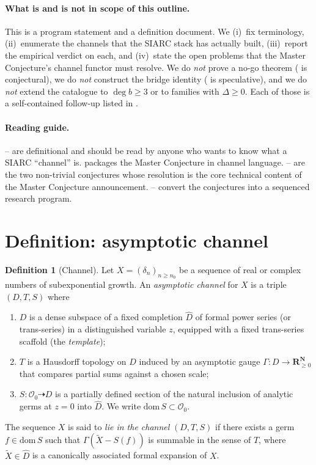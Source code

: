 \documentclass[11pt,reqno]{amsart}
\theoremstyle{plain}
\theoremstyle{definition}
\newtheorem{definition}[theorem]{Definition}
\theoremstyle{remark}
\newcommand{\dn}{\delta_{n}}
\begin{document}
\paragraph{What is and is not in scope of this outline.}
This is a program statement and a definition document. We
(i)~fix terminology, (ii)~enumerate the channels that the
SIARC stack has actually built, (iii)~report the empirical
verdict on each, and (iv)~state the open problems that the
Master Conjecture's channel functor must resolve. We do
\emph{not} prove a no-go theorem ( is
conjectural), we do \emph{not} construct the bridge identity
( is speculative), and we do \emph{not}
extend the catalogue to $\deg b \ge 3$ or to families with
$\Delta \geq 0$. Each of those is a self-contained follow-up
listed in .

\paragraph{Reading guide.}
-- are definitional and
should be read by anyone who wants to know what a SIARC
``channel'' is.  packages the Master
Conjecture in channel language. --%
 are the two non-trivial conjectures whose
resolution is the core technical content of the Master
Conjecture announcement. --%
 convert the conjectures into a sequenced
research program.

\section{Definition: asymptotic channel}
\label{sec:def}

\begin{definition}[Channel]\label{def:channel}
Let $X = (\dn)_{n \geq n_0}$ be a sequence of real or
complex numbers of subexponential growth. An
\emph{asymptotic channel} for $X$ is a triple $(D, T, S)$
where
\begin{enumerate}
\item $D$ is a dense subspace of a fixed completion
$\widehat{D}$ of formal power series (or trans-series)
in a distinguished variable $z$, equipped with a fixed
trans-series scaffold (the \emph{template});
\item $T$ is a Hausdorff topology on $D$ induced by an
asymptotic gauge $\Gamma : D \to \mathbf{R}_{\ge 0}^{\mathbf{N}}$
that compares partial sums against a chosen scale;
\item $S : \mathcal{O}_0 \dashrightarrow D$ is a partially
defined section of the natural inclusion of analytic
germs at $z=0$ into $\widehat{D}$. We write
$\mathrm{dom}\, S \subset \mathcal{O}_0$.
\end{enumerate}
The sequence $X$ is said to \emph{lie in the channel}
$(D,T,S)$ if there exists a germ $f \in \mathrm{dom}\, S$
such that $\Gamma(\widetilde X - S(f))$ is summable in the
sense of $T$, where $\widetilde X \in \widehat D$ is a
canonically associated formal expansion of $X$.
\end{definition}
\end{document}
